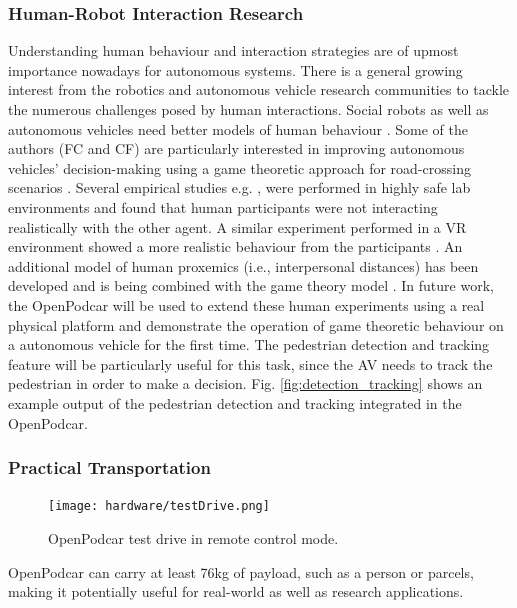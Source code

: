 \documentclass[a4paper]{article}
\begin{document}
	\subsubsection{Human-Robot Interaction Research}
	
	Understanding human behaviour and interaction strategies are of upmost importance nowadays for autonomous systems. There is a general growing interest from the robotics and autonomous vehicle research communities to tackle the numerous challenges posed by human interactions. Social robots as well as autonomous vehicles need better models of human behaviour \cite{camara2020pedestrian, camara2020pedestriana}. Some of the authors (FC and CF) are particularly interested in improving autonomous vehicles' decision-making using a game theoretic approach for road-crossing scenarios \cite{fox2018when}. Several empirical studies e.g. \cite{camara2018towards, camara2020continuous, camara2018empirical}, were performed in highly safe lab environments and found that human participants were not interacting realistically with the other agent. A similar experiment performed in a VR environment showed a more realistic behaviour from the participants \cite{camara2021evaluating, camara2019towards}. An additional model of human proxemics (i.e., interpersonal distances) has been developed and is being combined with the game theory model \cite{camara2020space, camaraextending}. In future work, the OpenPodcar will be used to extend these human experiments using a real physical platform and demonstrate the operation of game theoretic behaviour on a autonomous vehicle for the first time. The pedestrian detection and tracking feature will be particularly useful for this task, since the AV needs to track the pedestrian in order to make a decision. Fig. \ref{fig:detection_tracking} shows an example output of the pedestrian detection and tracking integrated in the OpenPodcar.
	
	
	\subsubsection{Practical Transportation}
	
	\begin{figure}
		\centering
		\texttt{[image: hardware/testDrive.png]}
		\caption{OpenPodcar test drive in remote control mode.}
		\label{fig:testDrive}
	\end{figure}
	
	OpenPodcar can carry at least 76kg of payload, such as a person or parcels, making it potentially useful for real-world as well as research applications.
	
\end{document}
